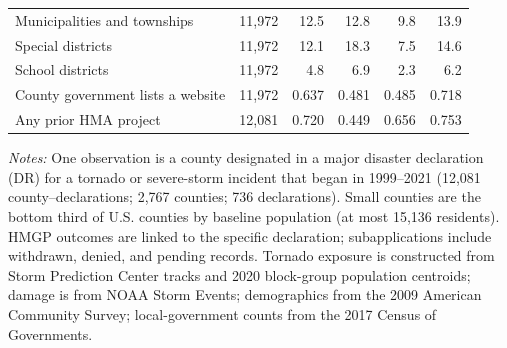 \begin{table}[!htbp]
\begin{threeparttable}
\begin{tabular}{@{}lrrrrr@{}}
\quad Municipalities and townships & 11,972 & 12.5 & 12.8 & 9.8 & 13.9 \\
\quad Special districts & 11,972 & 12.1 & 18.3 & 7.5 & 14.6 \\
\quad School districts & 11,972 & 4.8 & 6.9 & 2.3 & 6.2 \\
\quad County government lists a website & 11,972 & 0.637 & 0.481 & 0.485 & 0.718 \\
\quad Any prior HMA project & 12,081 & 0.720 & 0.449 & 0.656 & 0.753 \\
\bottomrule
\end{tabular}
\begin{tablenotes}[flushleft]
\footnotesize
\item \textit{Notes:} One observation is a county designated in a major disaster declaration (DR) for a tornado or severe-storm incident that began in 1999--2021 (12,081 county--declarations; 2,767 counties; 736 declarations). Small counties are the bottom third of U.S. counties by baseline population (at most 15,136 residents). HMGP outcomes are linked to the specific declaration; subapplications include withdrawn, denied, and pending records. Tornado exposure is constructed from Storm Prediction Center tracks and 2020 block-group population centroids; damage is from NOAA Storm Events; demographics from the 2009 American Community Survey; local-government counts from the 2017 Census of Governments.
\end{tablenotes}
\end{threeparttable}
\end{table}
